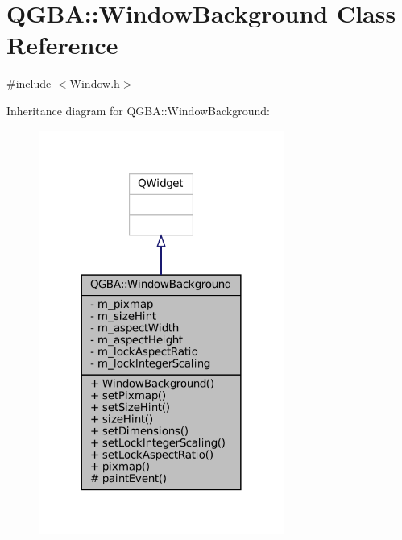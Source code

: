 \hypertarget{class_q_g_b_a_1_1_window_background}{}\section{Q\+G\+BA\+:\+:Window\+Background Class Reference}
\label{class_q_g_b_a_1_1_window_background}


{\ttfamily \#include $<$Window.\+h$>$}



Inheritance diagram for Q\+G\+BA\+:\+:Window\+Background\+:
\nopagebreak
\begin{figure}[H]
\begin{center}
\leavevmode
\includegraphics[width=228pt]{class_q_g_b_a_1_1_window_background__inherit__graph}
\end{center}
\end{figure}


